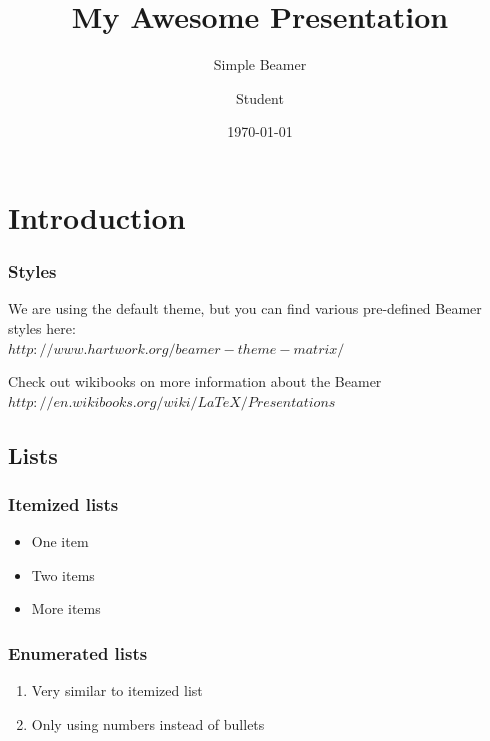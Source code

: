 \documentclass{beamer}
\title{My Awesome Presentation}
\subtitle{Simple Beamer}
\author{Student}
\date{\today}
\begin{document}
\begin{frame}
  \titlepage
\end{frame}

\section{Introduction}
\begin{frame}
  \frametitle{Styles}
  We are using the default theme, but you can find various pre-defined Beamer styles here: \\
 	$http://www.hartwork.org/beamer-theme-matrix/$
 	
 \noindent Check out wikibooks on more information about the Beamer \\
 $http://en.wikibooks.org/wiki/LaTeX/Presentations$
\end{frame}
\subsection{Lists}
\begin{frame}
  \frametitle{Itemized lists}
 	\begin{itemize}
        \item One item
        \item Two items
        \item More items
    \end{itemize}
\end{frame}
\begin{frame}
  \frametitle{Enumerated lists}
	\begin{enumerate}
        \item Very similar to itemized list
        \item Only using numbers instead of bullets
    \end{enumerate}
\end{frame}
\end{document}
